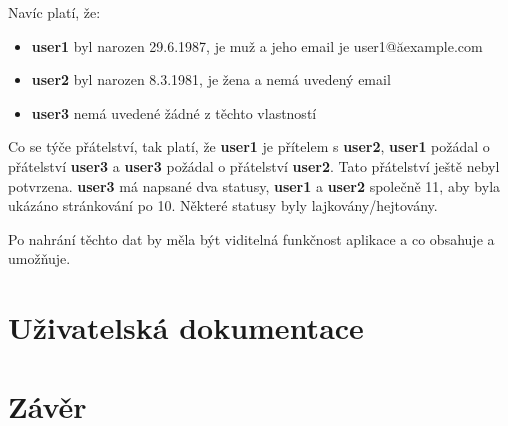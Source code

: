 \documentclass[
12pt,
a4paper,
pdftex,
czech,
titlepage
]{report}
\begin{document}
Navíc platí, že:
\begin{itemize}
\item \textbf{user1} byl narozen 29.6.1987, je muž a jeho email je user1@ăexample.com
\item \textbf{user2} byl narozen 8.3.1981, je žena a nemá uvedený email
\item \textbf{user3} nemá uvedené žádné z těchto vlastností
\end{itemize}

Co se týče přátelství, tak platí, že \textbf{user1} je přítelem s \textbf{user2}, \textbf{user1} požádal o přátelství \textbf{user3} a \textbf{user3} požádal o přátelství \textbf{user2}. Tato přátelství ještě nebyl potvrzena. \textbf{user3} má napsané dva statusy, \textbf{user1} a \textbf{user2} společně 11, aby byla ukázáno stránkování po 10. Některé statusy byly lajkovány/hejtovány.

Po nahrání těchto dat by měla být viditelná funkčnost aplikace a co obsahuje a umožňuje.

\chapter{Uživatelská dokumentace}


\chapter{Závěr}
\end{document}
